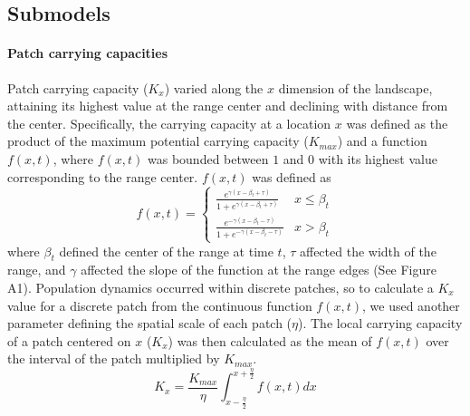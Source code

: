 \documentclass[11pt]{article}
\begin{document}
\subsection*{Submodels}
\paragraph{Patch carrying capacities}
Patch carrying capacity ($K_{x}$) varied along the $x$ dimension of the landscape, attaining its highest value at the range center and declining with distance from the center. Specifically, the carrying capacity at a location $x$ was defined as the product of the maximum potential carrying capacity ($K_{max}$) and a function $f(x,t)$, where $f(x,t)$ was bounded between $1$ and $0$ with its highest value corresponding to the range center. $f(x,t)$ was defined as
\begin{equation}
f(x,t)=
\begin{cases}
	\frac{e^{\gamma(x-\beta_{t}+\tau)}}{1+e^{\gamma(x-\beta_{t}+\tau)}} & x \leq \beta_{t} \\
	\frac{e^{-\gamma(x-\beta_{t}-\tau)}}{1+e^{-\gamma(x-\beta_{t}-\tau)}} & x > \beta_{t}
\end{cases}
\end{equation}
where $\beta_{t}$ defined the center of the range at time $t$, $\tau$ affected the width of the range, and $\gamma$ affected the slope of the function at the range edges (See Figure A1). Population dynamics occurred within discrete patches, so to calculate a $K_{x}$ value for a discrete patch from the continuous function $f(x,t)$, we used another parameter defining the spatial scale of each patch ($\eta$). The local carrying capacity of a patch centered on $x$ ($K_{x}$) was then calculated as the mean of $f(x,t)$ over the interval of the patch multiplied by $K_{max}$.
\begin{equation}
K_{x} = \frac{K_{max}}{\eta}\int_{x-\frac{\eta}{2}}^{x+\frac{\eta}{2}}f(x,t)dx
\end{equation}
\end{document}
